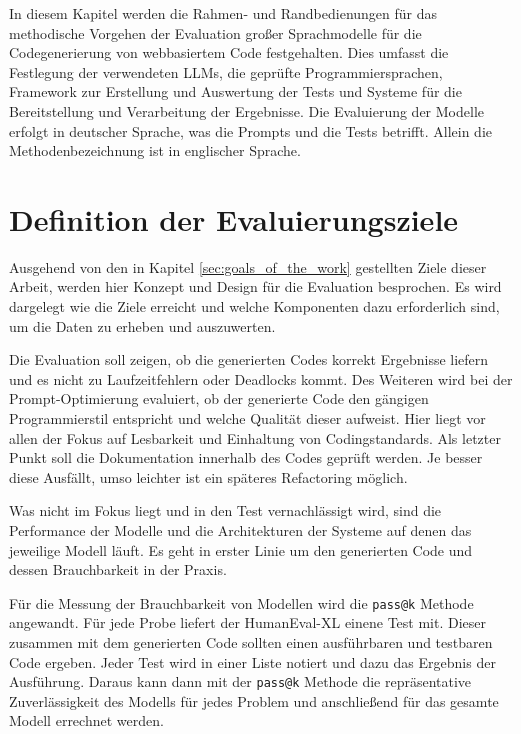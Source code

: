 In diesem Kapitel werden die Rahmen- und Randbedienungen für das methodische Vorgehen der Evaluation großer Sprachmodelle für die Codegenerierung von webbasiertem Code festgehalten. Dies umfasst die Festlegung der verwendeten LLMs, die geprüfte Programmiersprachen, Framework zur Erstellung und Auswertung der Tests und Systeme für die Bereitstellung und Verarbeitung der Ergebnisse. Die Evaluierung der Modelle erfolgt in deutscher Sprache, was die Prompts und die Tests betrifft. Allein die Methodenbezeichnung ist in englischer Sprache.

\section{Definition der Evaluierungsziele}

Ausgehend von den in Kapitel \ref{sec:goals_of_the_work} gestellten Ziele dieser Arbeit, werden hier Konzept und Design für die Evaluation besprochen. Es wird dargelegt wie die Ziele erreicht und welche Komponenten dazu erforderlich sind, um die Daten zu erheben und auszuwerten.\vspace{0.2cm}

Die Evaluation soll zeigen, ob die generierten Codes korrekt Ergebnisse liefern und es nicht zu Laufzeitfehlern oder Deadlocks kommt. Des Weiteren wird bei der Prompt-Optimierung evaluiert, ob der generierte Code den gängigen Programmierstil entspricht und welche Qualität dieser aufweist. Hier liegt vor allen der Fokus auf Lesbarkeit und Einhaltung von Codingstandards. Als letzter Punkt soll die Dokumentation innerhalb des Codes geprüft werden. Je besser diese Ausfällt, umso leichter ist ein späteres Refactoring möglich.\vspace{0.2cm}

Was nicht im Fokus liegt und in den Test vernachlässigt wird, sind die Performance der Modelle und die Architekturen der Systeme auf denen das jeweilige Modell läuft. Es geht in erster Linie um den generierten Code und dessen Brauchbarkeit in der Praxis.\vspace{0.2cm}

Für die Messung der Brauchbarkeit von Modellen wird die \texttt{pass@k} Methode angewandt. Für jede Probe liefert der HumanEval-XL einene Test mit. Dieser zusammen mit dem generierten Code sollten einen ausführbaren und testbaren Code ergeben. Jeder Test wird in einer Liste notiert und dazu das Ergebnis der Ausführung. Daraus kann dann mit der \texttt{pass@k} Methode die repräsentative Zuverlässigkeit des Modells für jedes Problem und anschließend für das gesamte Modell errechnet werden.\vspace{0.2cm}

